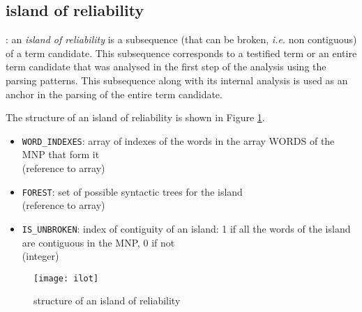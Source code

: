 \subsection{island of reliability}\label{ILOT}
\begin{definition}
: an \emph{island of reliability} is a subsequence
(that can be broken, \textit{i.e.} non contiguous) of a term candidate. This subsequence
corresponds to a testified term or an entire term candidate that was
analysed in the first step of the analysis using the parsing
patterns. This subsequence along with its internal analysis is used as
an anchor in the parsing of the entire term candidate.
\end{definition}
The structure of an island of reliability is shown in Figure \ref{filot}.
\begin{itemize}
\item \texttt{WORD\_INDEXES}: array of indexes of the words in the array WORDS of the MNP that form it\\ (reference to array)
\item \texttt{FOREST}: set of possible syntactic trees for the island\\ (reference to array)
\item \texttt{IS\_UNBROKEN}: index of contiguity of an island: 1 if all the words of the island are contiguous in the MNP, 0 if not\\ (integer)
\end{itemize}

\begin{figure}[!htbp]
\begin{center}
\texttt{[image: ilot]}
\caption{structure of an island of reliability}\label{filot}
\end{center}
\end{figure}
